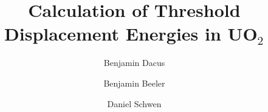 \documentclass[review]{elsarticle} %
\providecommand{\DIFaddtex}[1]{{\protect\color{blue} \sf #1}} %
\providecommand{\DIFaddbegin}{} %
\providecommand{\DIFaddend}{} %
\providecommand{\DIFdelbegin}{} %
\providecommand{\DIFdelend}{} %
\providecommand{\DIFadd}[1]{\texorpdfstring{\DIFaddtex{#1}}{#1}} %
\newcommand{\DIFscaledelfig}{0.5}
\newlength{\DIFdelgraphicswidth} %
\newlength{\DIFdelgraphicsheight} %
\newcommand{\DIFaddincludegraphics}[2][]{{\color{blue}\fbox{\DIFOincludegraphics[#1]{#2}}}} %
\newcommand{\DIFdelincludegraphics}[2][]{%
\sbox{\DIFdelgraphicsbox}{\DIFOincludegraphics[#1]{#2}}%
\settoboxwidth{\DIFdelgraphicswidth}{\DIFdelgraphicsbox} %
\settoboxtotalheight{\DIFdelgraphicsheight}{\DIFdelgraphicsbox} %
\scalebox{\DIFscaledelfig}{%
\parbox[b]{\DIFdelgraphicswidth}{\usebox{\DIFdelgraphicsbox}\\[-\baselineskip] \rule{\DIFdelgraphicswidth}{0em}}\llap{\resizebox{\DIFdelgraphicswidth}{\DIFdelgraphicsheight}{%
\setlength{\unitlength}{\DIFdelgraphicswidth}%
\begin{picture}(1,1)%
\thicklines\linethickness{2pt} %
{\color[rgb]{1,0,0}\put(0,0){\framebox(1,1){}}}%
{\color[rgb]{1,0,0}\put(0,0){\line( 1,1){1}}}%
{\color[rgb]{1,0,0}\put(0,1){\line(1,-1){1}}}%
\end{picture}%
}\hspace*{3pt}}} %
} %
\DeclareRobustCommand{\DIFaddbegin}{\DIFOaddbegin \let\includegraphics\DIFaddincludegraphics} %
\DeclareRobustCommand{\DIFaddend}{\DIFOaddend \let\includegraphics\DIFOincludegraphics} %
\DeclareRobustCommand{\DIFdelbegin}{\DIFOdelbegin \let\includegraphics\DIFdelincludegraphics} %
\DeclareRobustCommand{\DIFdelend}{\DIFOaddend \let\includegraphics\DIFOincludegraphics} %
\begin{document}
\DIFaddbegin \begin{frontmatter}
\DIFaddend 


\DIFdelbegin %
\DIFdelend \DIFaddbegin \title{\DIFadd{Calculation of Threshold Displacement Energies in UO$_2$}}
\DIFaddend 



\DIFdelbegin %
\DIFdelend \DIFaddbegin \author[ncst]{\DIFadd{Benjamin Dacus}}
\author[inl]{\DIFadd{Benjamin Beeler}}
\author[inl]{\DIFadd{Daniel Schwen}}
\address[inl]{Idaho National Laboratory, Idaho Falls, ID 83415}
\address[ncst]{North Carolina State University, Raleigh, NC 27695}






\end{frontmatter}
\end{document}
